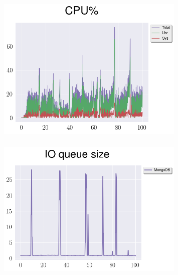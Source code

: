 \documentclass[usenames,dvipsnames, 18pt, compress, aspectratio=169]{beamer}
\begin{document}
\begin{frame}
    \frametitle{}
    \begin{center}
    \begin{figure}
        \includegraphics[width=0.8\textwidth,center]{benchmarks/mongodb_update_cpu_usage.png}
    \end{figure}
    \end{center}
\end{frame}

\begin{frame}
    \frametitle{}
    \begin{center}
    \vspace{10pt}
    \begin{figure}
        \includegraphics[width=0.8\textwidth,center]{benchmarks/mongodb_update_io_queue_size.png}
    \end{figure}
    \end{center}
\end{frame}
\end{document}
